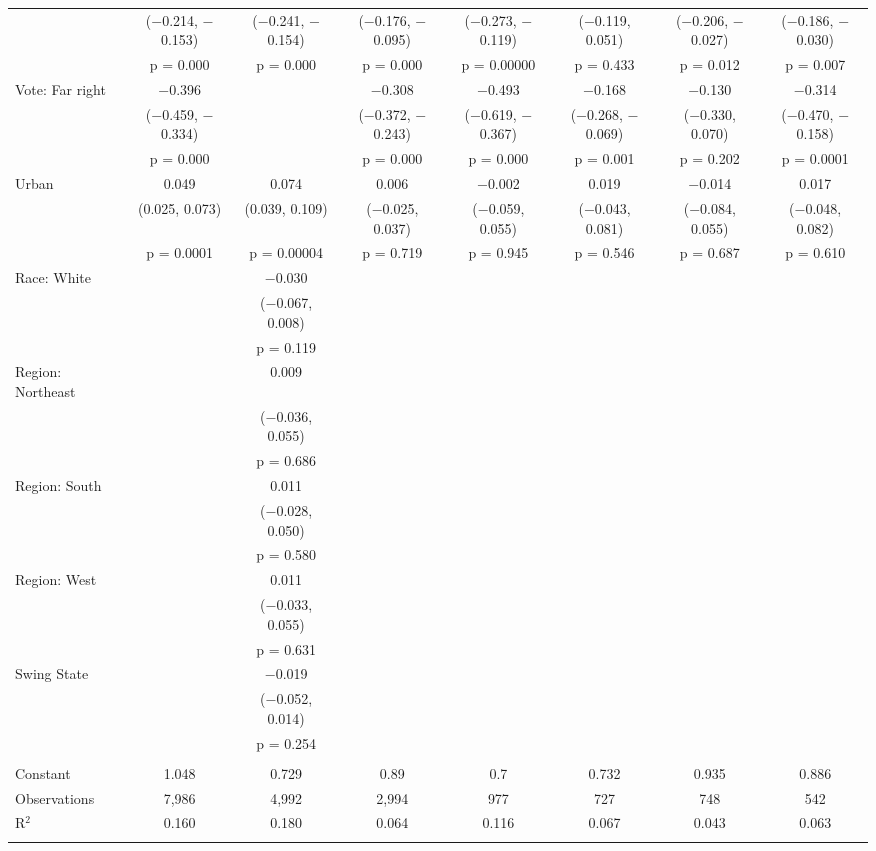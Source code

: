 \begin{tabular}{@{\extracolsep{5pt}}lccccccc}
  & ($-$0.214, $-$0.153) & ($-$0.241, $-$0.154) & ($-$0.176, $-$0.095) & ($-$0.273, $-$0.119) & ($-$0.119, 0.051) & ($-$0.206, $-$0.027) & ($-$0.186, $-$0.030) \\ 
  & p = 0.000 & p = 0.000 & p = 0.000 & p = 0.00000 & p = 0.433 & p = 0.012 & p = 0.007 \\ 
  Vote: Far right & $-$0.396 &  & $-$0.308 & $-$0.493 & $-$0.168 & $-$0.130 & $-$0.314 \\ 
  & ($-$0.459, $-$0.334) &  & ($-$0.372, $-$0.243) & ($-$0.619, $-$0.367) & ($-$0.268, $-$0.069) & ($-$0.330, 0.070) & ($-$0.470, $-$0.158) \\ 
  & p = 0.000 &  & p = 0.000 & p = 0.000 & p = 0.001 & p = 0.202 & p = 0.0001 \\ 
  Urban & 0.049 & 0.074 & 0.006 & $-$0.002 & 0.019 & $-$0.014 & 0.017 \\ 
  & (0.025, 0.073) & (0.039, 0.109) & ($-$0.025, 0.037) & ($-$0.059, 0.055) & ($-$0.043, 0.081) & ($-$0.084, 0.055) & ($-$0.048, 0.082) \\ 
  & p = 0.0001 & p = 0.00004 & p = 0.719 & p = 0.945 & p = 0.546 & p = 0.687 & p = 0.610 \\ 
  Race: White &  & $-$0.030 &  &  &  &  &  \\ 
  &  & ($-$0.067, 0.008) &  &  &  &  &  \\ 
  &  & p = 0.119 &  &  &  &  &  \\ 
  Region: Northeast &  & 0.009 &  &  &  &  &  \\ 
  &  & ($-$0.036, 0.055) &  &  &  &  &  \\ 
  &  & p = 0.686 &  &  &  &  &  \\ 
  Region: South &  & 0.011 &  &  &  &  &  \\ 
  &  & ($-$0.028, 0.050) &  &  &  &  &  \\ 
  &  & p = 0.580 &  &  &  &  &  \\ 
  Region: West &  & 0.011 &  &  &  &  &  \\ 
  &  & ($-$0.033, 0.055) &  &  &  &  &  \\ 
  &  & p = 0.631 &  &  &  &  &  \\ 
  Swing State &  & $-$0.019 &  &  &  &  &  \\ 
  &  & ($-$0.052, 0.014) &  &  &  &  &  \\ 
  &  & p = 0.254 &  &  &  &  &  \\ 
 \hline \\[-1.8ex] 
Constant & 1.048 & 0.729 & 0.89 & 0.7 & 0.732 & 0.935 & 0.886 \\ 
Observations & 7,986 & 4,992 & 2,994 & 977 & 727 & 748 & 542 \\ 
R$^{2}$ & 0.160 & 0.180 & 0.064 & 0.116 & 0.067 & 0.043 & 0.063 \\ 
\hline 
\hline \\[-1.8ex] 
\end{tabular} 
